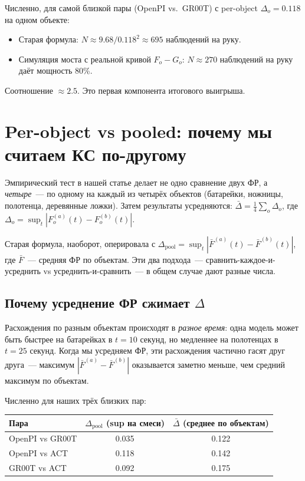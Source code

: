 \documentclass[11pt]{article}
\begin{document}
Численно, для самой близкой пары (OpenPI vs.\ GR00T) с per-object $\Delta_o = 0.118$ на одном объекте:
\begin{itemize}[leftmargin=2em, itemsep=1pt]
\item Старая формула: $N \approx 9.68/0.118^2 \approx 695$ наблюдений на руку.
\item Симуляция моста с реальной кривой $F_o - G_o$: $N \approx 270$ наблюдений на руку даёт мощность 80\%.
\end{itemize}
Соотношение $\approx 2.5$. Это первая компонента итогового выигрыша.

\section{Per-object vs pooled: почему мы считаем КС по-другому}

Эмпирический тест в нашей статье делает не одно сравнение двух ФР, а \emph{четыре}~--- по одному на каждый из четырёх объектов (батарейки, ножницы, полотенца, деревянные ложки). Затем результаты усредняются: $\bar\Delta = \frac{1}{4}\sum_o \Delta_o$, где $\Delta_o = \sup_t |F^{(a)}_o(t) - F^{(b)}_o(t)|$.

Старая формула, наоборот, оперировала с $\Delta_\text{pool} = \sup_t |\bar F^{(a)}(t) - \bar F^{(b)}(t)|$, где $\bar F$~--- средняя ФР по объектам. Эти два подхода~--- сравнить-каждое-и-усреднить vs усреднить-и-сравнить~--- в общем случае дают разные числа.

\subsection{Почему усреднение ФР сжимает $\Delta$}

Расхождения по разным объектам происходят в \emph{разное время}: одна модель может быть быстрее на батарейках в $t = 10$ секунд, но медленнее на полотенцах в $t = 25$ секунд. Когда мы усредняем ФР, эти расхождения частично гасят друг друга~--- максимум $|\bar F^{(a)} - \bar F^{(b)}|$ оказывается заметно меньше, чем средний максимум по объектам.

Численно для наших трёх близких пар:

\medskip
\begin{tabular}{lcc}
\toprule
Пара & $\Delta_\text{pool}$ (sup на смеси) & $\bar\Delta$ (среднее по объектам) \\
\midrule
OpenPI vs GR00T & 0.035 & 0.122 \\
OpenPI vs ACT   & 0.118 & 0.142 \\
GR00T vs ACT    & 0.092 & 0.175 \\
\bottomrule
\end{tabular}
\medskip
\end{document}
